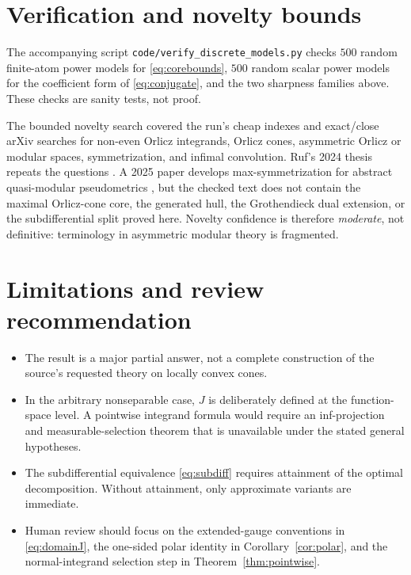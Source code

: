 \documentclass[11pt]{article}
\theoremstyle{definition}
\begin{document}
\section{Verification and novelty bounds}

The accompanying script \texttt{code/verify\_discrete\_models.py} checks
$500$ random finite-atom power models for \eqref{eq:corebounds}, $500$
random scalar power models for the coefficient form of
\eqref{eq:conjugate}, and the two sharpness families above.  These checks are
sanity tests, not proof.

The bounded novelty search covered the run's cheap indexes and exact/close
arXiv searches for non-even Orlicz integrands, Orlicz cones, asymmetric
Orlicz or modular spaces, symmetrization, and infimal convolution.  Ruf's
2024 thesis repeats the questions \cite{Ruf2024}.  A 2025 paper develops
max-symmetrization for abstract quasi-modular pseudometrics
\cite{Majozi2025}, but the checked text does not contain the maximal
Orlicz-cone core, the generated hull, the Grothendieck dual extension, or the
subdifferential split proved here.  Novelty confidence is therefore
\emph{moderate}, not definitive: terminology in asymmetric modular theory is
fragmented.

\section{Limitations and review recommendation}

\begin{itemize}[leftmargin=*]
\item The result is a major partial answer, not a complete construction of
the source's requested theory on locally convex cones.
\item In the arbitrary nonseparable case, $J$ is deliberately defined at the
function-space level.  A pointwise integrand formula would require an
inf-projection and measurable-selection theorem that is unavailable under the
stated general hypotheses.
\item The subdifferential equivalence \eqref{eq:subdiff} requires attainment
of the optimal decomposition.  Without attainment, only approximate
variants are immediate.
\item Human review should focus on the extended-gauge conventions in
\eqref{eq:domainJ}, the one-sided polar identity in
Corollary~\ref{cor:polar}, and the normal-integrand selection step in
Theorem~\ref{thm:pointwise}.
\end{itemize}
\end{document}
